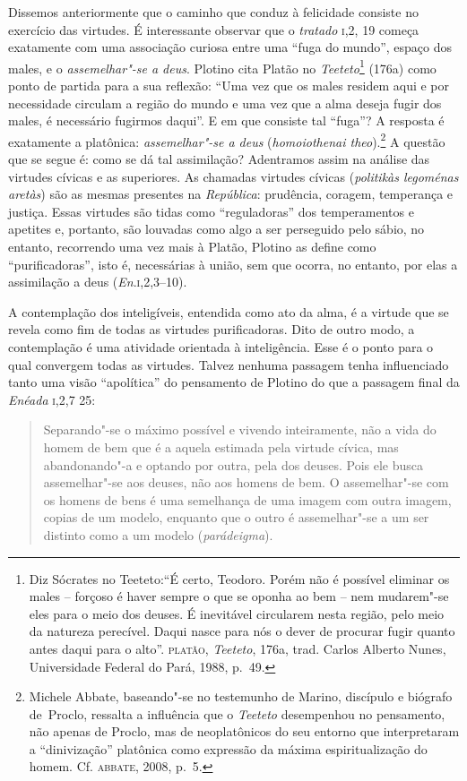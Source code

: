 {Dissemos anteriormente que o caminho que conduz à felicidade
consiste no exercício das virtudes. É interessante observar que o
\emph{tratado} \textsc{i},2, 19 começa exatamente com uma associação curiosa
entre uma “fuga do mundo”, espaço dos males, e o \emph{assemelhar"-se
a deus}. Plotino cita Platão no \emph{Teeteto}\footnote{ Diz Sócrates
no Teeteto:``É certo, Teodoro. Porém não é possível eliminar os
males – forçoso é haver sempre o que se oponha ao bem – nem mudarem"-se
eles para o meio dos deuses. É inevitável circularem nesta região, pelo
meio da natureza perecível. Daqui nasce para  nós o dever de procurar
fugir quanto antes daqui para o alto''. \textsc{platão},
\emph{Teeteto}, 176a, trad. Carlos Alberto Nunes, Universidade
Federal do Pará, 1988, p.~49.} (176a) como ponto
de partida para a sua reflexão: ``Uma vez que os males residem aqui
e por necessidade circulam a região do mundo e uma vez que a alma deseja
fugir dos males, é necessário fugirmos daqui''. E em que consiste tal
“fuga”? A resposta é exatamente a platônica: \emph{assemelhar"-se a
deus} (\emph{homoiothenai the}\emph{o}).\footnote{ Michele Abbate,
baseando"-se no testemunho de Marino, discípulo e biógrafo \mbox{de Proclo,}
ressalta a influência que o \emph{Teeteto} desempenhou no pensamento,
não apenas de Proclo, mas de neoplatônicos do seu entorno que
interpretaram a “dinivização” platônica como expressão da máxima
espiritualização do homem. Cf. \textsc{abbate}, 2008, p.~5.} A questão que
se segue é: como se dá tal assimilação? Adentramos assim na análise das
virtudes cívicas e as superiores. As chamadas virtudes cívicas
(\emph{politikàs legoménas aretàs}) são as mesmas presentes na
\emph{República}: prudência, coragem, temperança e justiça. Essas
virtudes são tidas como “reguladoras” dos temperamentos e apetites e,
portanto, são louvadas como algo a ser perseguido pelo sábio, no
entanto, recorrendo uma vez mais à Platão, Plotino as define como
“purificadoras”, isto é, necessárias à união, sem que ocorra, no entanto,
por elas a assimilação a deus (\emph{En}.\textsc{i},2,3--10). 

A contemplação dos inteligíveis, entendida como ato da alma, é a
virtude que se revela como fim de todas as virtudes purificadoras. Dito
de outro modo, a contemplação é uma atividade orientada à inteligência.
Esse é o ponto para o qual convergem todas as virtudes. Talvez nenhuma
passagem tenha influenciado tanto uma visão “apolítica” do pensamento
de Plotino do que a passagem final da \emph{Enéada} \textsc{i},2,7 25: 

\begin{quote} 
Separando"-se o máximo possível e vivendo inteiramente, não a vida do
homem de bem que é a aquela estimada pela virtude cívica, mas
abandonando"-a e optando por outra, pela dos deuses. Pois ele busca
assemelhar"-se aos deuses, não aos homens de bem. O assemelhar"-se com os
homens de bens é uma semelhança de uma imagem com outra imagem, copias
de um modelo, enquanto que o outro é assemelhar"-se a um ser distinto
como a um modelo (\emph{parádeigma}).
\end{quote} 

}
